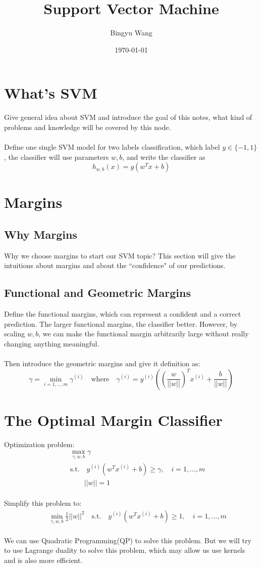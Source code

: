 \documentclass[a4paper]{article}
\title{Support Vector Machine}
\author{Bingyu Wang}
\date{\today}
\begin{document}
\maketitle
\section{What's SVM}
Give general idea about SVM and introduce the goal of this notes, what kind of problems and knowledge will be covered by this node. \\ \\
Define one single SVM model for two labels classification, which label $y \in \{-1, 1\}$ , the classifier will use parameters $w, b$, and write the classifier as 
$$
h_{w,b}(x) = g(w^T x + b)
$$

\section{Margins}
\subsection{Why Margins}
Why we choose margins to start our SVM topic? This section will give the intuitions about margins and about the ``confidence" of our predictions. 
\subsection{Functional and Geometric Margins}
Define the functional margins, which can represent a confident and a correct prediction. The larger functional margins, the classifier better. However, by scaling $w, b$, we can make the functional margin arbitrarily large without really changing anything meaningful. \\ \\
Then introduce the geometric margins and give it definition as:
$$
	\gamma = \min_{i=1,\dots,m} \gamma^{(i)} 
	\quad \text{where} \quad  \gamma^{(i)} = y^{(i)}((\frac{w}{||w||})^T x^{(i)} + \frac{b}{||w||})
$$

\section{The Optimal Margin Classifier}
Optimization problem:
\begin{align*}
&\quad  \max_{\gamma, w, b} \gamma \\
&\quad  \text{s.t.} \quad  y^{(i)}(w^Tx^{(i)} + b) \geq \gamma, \quad i = 1, \dots, m \\
&\quad   \quad \quad ||w|| = 1
\end{align*}
\\
Simplify this problem to:
\begin{align}
&\quad \min_{\gamma, w, b} \frac{1}{2} ||w||^2 
\quad \text{s.t.} \quad y^{(i)}(w^T x^{(i)} + b) \geq 1, \quad i = 1, \dots, m
\end{align}
\\
We can use Quadratic Programming(QP) to solve this problem. But we will try to use Lagrange duality to solve this problem, which may allow us use kernels and is also more efficient. 
\end{document}
